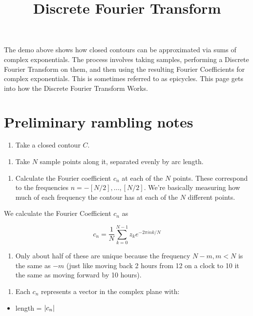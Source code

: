 \documentclass{article}
\title{Discrete Fourier Transform}
\begin{document}

The demo above shows how closed contours can be approximated via sums of complex exponentials. The process involves taking samples, performing a Discrete Fourier Transform on them, and then using the resulting Fourier Coefficients for complex exponentials. This is sometimes referred to as epicycles. This page gets into how the Discrete Fourier Transform Works.

\section{Preliminary rambling notes}

\begin{enumerate}
\item Take a closed contour $C.$
\end{enumerate}

\begin{enumerate}
\item Take $N$ sample points along it, separated evenly by arc length.
\end{enumerate}

\begin{enumerate}
\item Calculate the Fourier coefficient $c_n$ at each of the $N$ points. These correspond to the frequencies $n = -[N/2], \dots, [N/2].$ We're basically measuring how much of each frequency the contour has at each of the $N$ different points.
\end{enumerate}

We calculate the Fourier Coefficient $c_n$ as

\[ c_n = \frac{1}{N} \sum_{k=0}^{N-1} z_k e^{-2 \pi i n k / N} \]

\begin{enumerate}
\item Only about half of these are unique because the frequency $N - m, m < N$ is the same as $-m$ (just like moving back 2 hours from 12 on a clock to 10 it the same as moving forward by 10 hours).
\end{enumerate}

\begin{enumerate}
\item Each $c_n$ represents a \@{vector} in the complex plane with:
\end{enumerate}

\begin{itemize}
\item length = $\left| c_n \right|$
\end{itemize}
\end{document}
